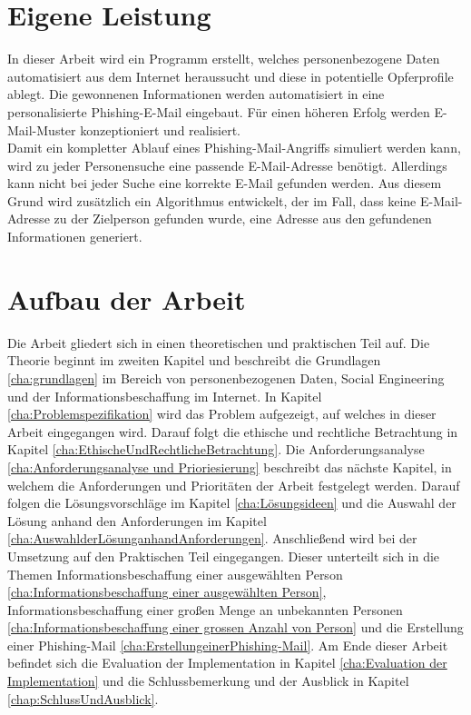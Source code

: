 

 	
\section{Eigene Leistung}
\label {sec:Eigene Leistung} 
In dieser Arbeit wird ein Programm erstellt, welches personenbezogene Daten automatisiert aus dem Internet heraussucht und diese in potentielle Opferprofile ablegt. Die gewonnenen Informationen werden  automatisiert in eine personalisierte Phishing-E-Mail eingebaut. Für einen höheren Erfolg werden E-Mail-Muster konzeptioniert und realisiert.\\
Damit ein kompletter Ablauf eines Phishing-Mail-Angriffs simuliert werden kann, wird zu jeder Personensuche eine passende E-Mail-Adresse benötigt. Allerdings kann nicht bei jeder Suche eine korrekte E-Mail gefunden werden. Aus diesem Grund wird zusätzlich ein Algorithmus entwickelt, der im Fall, dass keine E-Mail-Adresse zu der Zielperson gefunden wurde, eine Adresse aus den gefundenen Informationen generiert.

\section{Aufbau der Arbeit}
\label {sec:Aufbau der Arbeit} 
Die Arbeit gliedert sich in einen theoretischen und praktischen Teil auf. Die Theorie beginnt im zweiten Kapitel und beschreibt die Grundlagen \ref{cha:grundlagen} im Bereich von personenbezogenen Daten, Social Engineering und der Informationsbeschaffung im Internet. In Kapitel \ref{cha:Problemspezifikation} wird das Problem aufgezeigt, auf welches in dieser Arbeit eingegangen wird. Darauf folgt die ethische und rechtliche Betrachtung in Kapitel \ref{cha:EthischeUndRechtlicheBetrachtung}. Die Anforderungsanalyse \ref{cha:Anforderungsanalyse und Prioriesierung} beschreibt das nächste Kapitel, in welchem die Anforderungen und Prioritäten der Arbeit festgelegt werden. Darauf folgen die Lösungsvorschläge im Kapitel \ref{cha:Lösungsideen} und die Auswahl der Lösung anhand den Anforderungen im Kapitel \ref{cha:AuswahlderLösunganhandAnforderungen}. Anschließend wird bei der Umsetzung auf den Praktischen Teil eingegangen. Dieser unterteilt sich in die Themen Informationsbeschaffung einer ausgewählten Person \ref{cha:Informationsbeschaffung einer ausgewählten Person}, Informationsbeschaffung einer großen Menge an unbekannten Personen \ref{cha:Informationsbeschaffung einer grossen Anzahl von Person} und die Erstellung einer Phishing-Mail \ref{cha:ErstellungeinerPhishing-Mail}. Am Ende dieser Arbeit befindet sich die Evaluation der Implementation in Kapitel \ref{cha:Evaluation der Implementation} und die Schlussbemerkung und der Ausblick in Kapitel \ref{chap:SchlussUndAusblick}.






